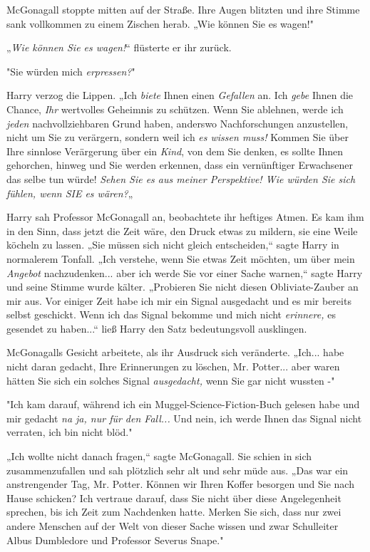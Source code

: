 {McGonagall stoppte mitten auf der Straße. Ihre Augen blitzten und ihre Stimme sank vollkommen zu einem Zischen herab. „Wie können Sie es wagen!"

„\emph{Wie können Sie es wagen!}“ flüsterte er ihr zurück.

"Sie würden mich \emph{erpressen?}"

Harry verzog die Lippen. „Ich \emph{biete} Ihnen einen \emph{Gefallen} an. Ich \emph{gebe} Ihnen die Chance, \emph{Ihr} wertvolles Geheimnis zu schützen. Wenn Sie ablehnen, werde ich \emph{jeden} nachvollziehbaren Grund haben, anderswo Nachforschungen anzustellen, nicht um Sie zu verärgern, sondern weil ich \emph{es wissen muss!} Kommen Sie über Ihre sinnlose Verärgerung über ein \emph{Kind}, von dem Sie denken, es sollte Ihnen gehorchen, hinweg und Sie werden erkennen, dass ein vernünftiger Erwachsener das selbe tun würde! \emph{Sehen Sie es aus meiner Perspektive! Wie würden Sie sich fühlen, wenn SIE es wären?}„

Harry sah Professor McGonagall an, beobachtete ihr heftiges Atmen. Es kam ihm in den Sinn, dass jetzt die Zeit wäre, den Druck etwas zu mildern, sie eine Weile köcheln zu lassen. „Sie müssen sich nicht gleich entscheiden,“ sagte Harry in normalerem Tonfall. „Ich verstehe, wenn Sie etwas Zeit möchten, um über mein \emph{Angebot} nachzudenken... aber ich werde Sie vor einer Sache warnen,“ sagte Harry und seine Stimme wurde kälter. „Probieren Sie nicht diesen Obliviate-Zauber an mir aus. Vor einiger Zeit habe ich mir ein Signal ausgedacht und es mir bereits selbst geschickt. Wenn ich das Signal bekomme und mich nicht \emph{erinnere,} es gesendet zu haben...“ ließ Harry den Satz bedeutungsvoll ausklingen.

McGonagalls Gesicht arbeitete, als ihr Ausdruck sich veränderte. „Ich... habe nicht daran gedacht, Ihre Erinnerungen zu löschen, Mr. Potter... aber waren hätten Sie sich ein solches Signal \emph{ausgedacht,} wenn Sie gar nicht wussten -"

"Ich kam darauf, während ich ein Muggel-Science-Fiction-Buch gelesen habe und mir gedacht \emph{na ja, nur für den Fall...} Und nein, ich werde Ihnen das Signal nicht verraten, ich bin nicht blöd."

„Ich wollte nicht danach fragen,“ sagte McGonagall. Sie schien in sich zusammenzufallen und sah plötzlich sehr alt und sehr müde aus. „Das war ein anstrengender Tag, Mr. Potter. Können wir Ihren Koffer besorgen und Sie nach Hause schicken? Ich vertraue darauf, dass Sie nicht über diese Angelegenheit sprechen, bis ich Zeit zum Nachdenken hatte. Merken Sie sich, dass nur zwei andere Menschen auf der Welt von dieser Sache wissen und zwar Schulleiter Albus Dumbledore und Professor Severus Snape."

}
